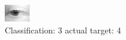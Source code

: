 \begin{figure}[h!]
\begin{center}
\includegraphics[width=0.60\columnwidth]{figures/ID2604_class_3_target_4.png}
\end{center}
\caption{ Classification: 3 actual target: 4}
\label{fig:ID2604_class_3_target_4}
\end{figure}
